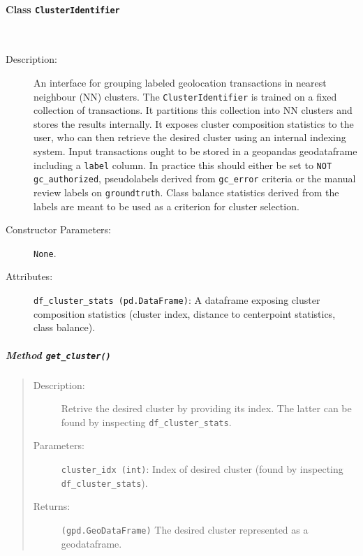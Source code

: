 \documentclass[a4paper, 10pt]{article}
\theoremstyle{plain}
\theoremstyle{definition}
\numberwithin{equation}{section}
\newcommand{\subsubsubsection}[1]{\paragraph{#1}\mbox{}\\}
\begin{document}
\subsubsubsection{Class \texttt{ClusterIdentifier}}

\begin{description}
    \item[Description:] An interface for grouping labeled geolocation transactions in nearest neighbour (NN) clusters. The \texttt{ClusterIdentifier} is trained on a fixed collection of transactions. It partitions this collection into NN clusters and stores the results internally. It exposes cluster composition statistics to the user, who can then retrieve the desired cluster using an internal indexing system. Input transactions ought to be stored in a geopandas geodataframe including a \texttt{label} column. In practice this should either be set to \texttt{NOT gc\_authorized}, pseudolabels derived from \texttt{gc\_error} criteria or the manual review labels on \texttt{groundtruth}. Class balance statistics derived from the labels are meant to be used as a criterion for cluster selection.
    \item[Constructor Parameters:] \texttt{None}.
    \item[Attributes:] \texttt{df\_cluster\_stats (pd.DataFrame)}: A dataframe exposing cluster composition statistics (cluster index, distance to centerpoint statistics, class balance).
\end{description}

\subparagraph{Method \texttt{get\_cluster()}}

\begin{quote}
    \begin{description}
        \item[Description:] Retrive the desired cluster by providing its index. The latter can be found by inspecting \texttt{df\_cluster\_stats}.
        \item[Parameters:] \texttt{cluster\_idx (int)}: Index of desired cluster (found by inspecting \texttt{df\_cluster\_stats}).
        \item[Returns:] \texttt{(gpd.GeoDataFrame)} The desired cluster represented as a geodataframe.
    \end{description}
\end{quote}
\end{document}
